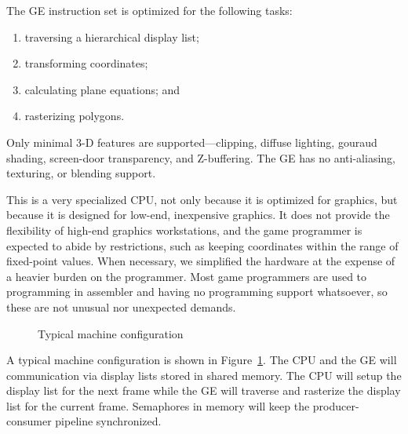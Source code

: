 \documentclass{book}
\begin{document}
The GE instruction set is optimized for the following tasks:
\begin{enumerate}
\item traversing a hierarchical display list;
\item transforming coordinates;
\item calculating plane equations; and
\item rasterizing polygons.
\end{enumerate}
Only minimal 3-D features are supported---clipping,
diffuse lighting, gouraud shading, screen-door transparency, and
Z-buffering.  The GE has no anti-aliasing, texturing, or blending
support.

This is a very specialized CPU, not only because it is optimized
for graphics, but because it is designed for low-end, inexpensive
graphics.  It does not provide the flexibility of high-end graphics
workstations, and the game programmer is expected to abide by
restrictions, such as keeping coordinates within the range of
fixed-point values.  When necessary, we simplified the hardware at the
expense of a heavier burden on the programmer.  Most game programmers
are used to programming in assembler and having no programming support
whatsoever, so these are not unusual nor unexpected demands.

\begin{figure}
\setlength{\unitlength}{1em}
\caption{Typical machine configuration}
\label{fig:configuration}
\end{figure}

A typical machine configuration is shown in Figure~\ref{fig:configuration}.
The CPU and the GE will communication via display lists
stored in shared memory.  The CPU will setup the display list for the
next frame while the GE will traverse and rasterize the display list for
the current frame.  Semaphores in memory will keep the producer-consumer
pipeline synchronized.
\end{document}
